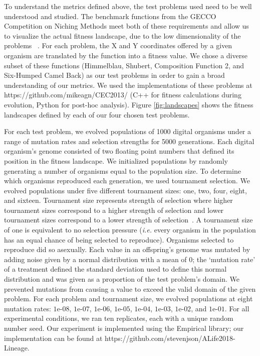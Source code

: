 \documentclass[letterpaper]{article}
\begin{document}
To understand the metrics defined above, the test problems used need to be well understood and studied. The benchmark functions from the GECCO Competition on Niching Methods meet both of these requirements and allow us to visualize the actual fitness landscape, due to the low dimensionality of the problems ~\citep{li_benchmark_2013}. For each problem, the X and Y coordinates offered by a given organism are translated by the function into a fitness value. We chose a diverse subset of these functions (Himmelblau, Shubert, Composition Function 2, and Six-Humped Camel Back) as our test problems in order to gain a broad understanding of our metrics. We used the implementations of these problems at https://github.com/mikeagn/CEC2013/ (C++ for fitness calculations during evolution, Python for post-hoc analysis). Figure \ref{fig:landscapes} shows the fitness landscapes defined by each of our four chosen test problems. 

For each test problem, we evolved populations of 1000 digital organisms under a range of mutation rates and selection strengths for 5000 generations. Each digital organism's genome consisted of two floating point numbers that defined its position in the fitness landscape. 
We initialized populations by randomly generating a number of organisms equal to the population size. 
To determine which organisms reproduced each generation, we used tournament selection. We evolved populations under five different tournament sizes: one, two, four, eight, and sixteen.  Tournament size represents strength of selection where higher tournament sizes correspond to a higher strength of selection and lower tournament sizes correspond to a lower strength of selection~\citep{blickle1995mathematical}.
A tournament size of one is equivalent to no selection pressure (\textit{i.e.} every organism in the population has an equal chance of being selected to reproduce). Organisms selected to reproduce did so asexually. Each value in an offspring's genome was mutated by adding noise given by a normal distribution with a mean of 0; the `mutation rate' of a treatment defined the standard deviation used to define this normal distribution and was given as a proportion of the test problem's domain. 
We prevented mutations from causing a value to exceed the valid domain of the given problem. 
For each problem and tournament size, we evolved populations at eight mutation rates: $1\text{e-}08$, $1\text{e-}07$, $1\text{e-}06$, $1\text{e-}05$, $1\text{e-}04$, $1\text{e-}03$, $1\text{e-}02$, and $1\text{e-}01$. 
For all experimental conditions, we ran ten replicates, each with a unique random number seed. 
Our experiment is implemented using the Empirical library; our implementation can be found at https://github.com/stevenjson/ALife2018-Lineage. %
\end{document}
